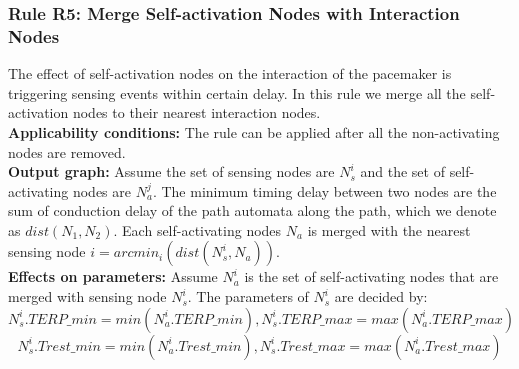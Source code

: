 \subsubsection{Rule R5: Merge Self-activation Nodes with Interaction Nodes}
The effect of self-activation nodes on the interaction of the pacemaker is triggering sensing events within certain delay. In this rule we merge all the self-activation nodes to their nearest interaction nodes. \\
\textbf{Applicability conditions: }The rule can be applied after all the non-activating nodes are removed.\\
\textbf{Output graph: }Assume the set of sensing nodes are $N_s^i$ and the set of self-activating nodes are $N_a^j$. The minimum timing delay between two nodes are the sum of conduction delay of the path automata along the path, which we denote as $dist(N_1,N_2)$. Each self-activating nodes $N_a$ is merged with the nearest sensing node $i=arcmin_i(dist(N_s^i,N_a))$.\\
\textbf{Effects on parameters: }Assume $N_a^i$ is the set of self-activating nodes that are merged with sensing node $N_s^i$. The parameters of $N_s^i$ are decided by:
$$N_s^i.TERP\_min=min(N_a^i.TERP\_min), N_s^i.TERP\_max=max(N_a^i.TERP\_max)$$
$$N_s^i.Trest\_min=min(N_a^i.Trest\_min), N_s^i.Trest\_max=max(N_a^i.Trest\_max)$$

